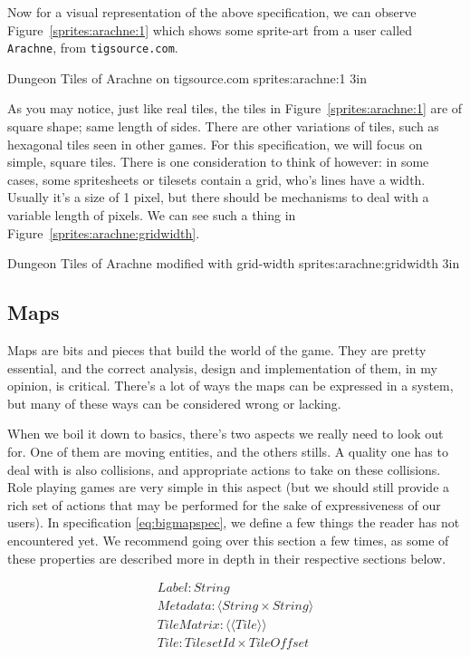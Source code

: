 Now for a visual representation of the above specification, we can observe
Figure~\ref{sprites:arachne:1} which shows some sprite-art from a user called
\texttt{Arachne}, from \texttt{tigsource.com}.

%
       {Dungeon Tiles of Arachne on tigsource.com \cite{arachnesprite1}}%
       {sprites:arachne:1}%
       {3in}

As you may notice, just like real tiles, the tiles in
Figure~\ref{sprites:arachne:1} are of square shape; same length of sides. There
are other variations of tiles, such as hexagonal tiles seen in other games. For
this specification, we will focus on simple, square tiles. There is one
consideration to think of however: in some cases, some spritesheets or tilesets
contain a grid, who's lines have a width. Usually it's a size of 1 pixel, but
there should be mechanisms to deal with a variable length of pixels. We can see
such a thing in Figure~\ref{sprites:arachne:gridwidth}.

%
       {Dungeon Tiles of Arachne modified with grid-width}%
       {sprites:arachne:gridwidth}%
       {3in}

\subsection{Maps}

Maps are bits and pieces that build the world of the game. They are pretty
essential, and the correct analysis, design and implementation of them, in my
opinion, is critical. There's a lot of ways the maps can be expressed in a
system, but many of these ways can be considered wrong or lacking.

When we boil it down to basics, there's two aspects we really need to look out
for. One of them are moving entities, and the others stills. A quality one has
to deal with is also collisions, and appropriate actions to take on these
collisions. Role playing games are very simple in this aspect (but we should
still provide a rich set of actions that may be performed for the sake of
expressiveness of our users). In specification \ref{eq:bigmapspec}, we define a
few things the reader has not encountered yet. We recommend going over this
section a few times, as some of these properties are described more in depth in
their respective sections below.

\begin{equation}
\begin{split} \label{eq:bigmapspec}
Label\colon String \\
Metadata\colon \langle String \times String \rangle \\
TileMatrix\colon \langle \langle Tile \rangle \rangle \\
Tile\colon TilesetId \times TileOffset
\end{split}
\end{equation}

